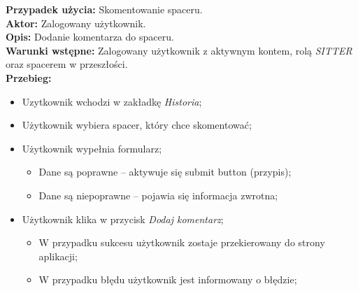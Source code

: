 \noindent
\textbf{Przypadek użycia:}  Skomentowanie spaceru. \\
\textbf{Aktor:} Zalogowany użytkownik. \\
\textbf{Opis:} Dodanie komentarza do spaceru. \\
\textbf{Warunki wstępne:} Zalogowany użytkownik z aktywnym kontem, rolą \textit{SITTER} oraz spacerem w przeszłości. \\
\textbf{Przebieg:}
\begin{itemize}[leftmargin=1cm]
    \item Uzytkownik wchodzi w zakładkę \textit{Historia};
    \item Użytkownik wybiera spacer, który chce skomentować;
    \item Użytkownik wypełnia formularz;
    \begin{itemize}
        \item Dane są poprawne -- aktywuje się submit button (przypis);
        \item Dane są niepoprawne -- pojawia się informacja zwrotna;
    \end{itemize}
    \item Użytkownik klika w przycisk \textit{Dodaj komentarz};
    \begin{itemize}
        \item W przypadku sukcesu użytkownik zostaje przekierowany do strony aplikacji;
        \item W przypadku błędu użytkownik jest informowany o błędzie;
    \end{itemize}
\end{itemize}

